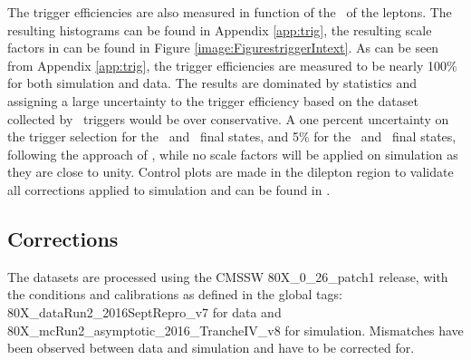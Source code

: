 The trigger efficiencies are also measured in function of the \pt\ of the leptons. The resulting histograms can be found in Appendix \ref{app:trig}, the resulting scale factors in can be found in Figure \ref{image:FigurestriggerIntext}.
%	
As can be seen from Appendix \ref{app:trig}, the trigger efficiencies are measured to be nearly 100\% for both simulation and data. The results are dominated by statistics and assigning a large uncertainty to the trigger efficiency based on the dataset collected by \Etmis\ triggers would be over conservative. A one percent uncertainty on the trigger selection for the \eemu\ and \mumumu\ final states, and 5\% for the \eee\ and \emumu\ final states, following the approach of \cite{Sirunyan:2017kkr}, while no scale factors will be applied on simulation as they are close to unity. Control plots are made in the dilepton region to validate all corrections applied to simulation and can be found in .

\subsection{Corrections}
\label{sec:controldilep}

\label{sec:corrections}
The datasets are processed using the CMSSW 80X\_0\_26\_patch1 release, with the conditions and calibrations as defined in the global tags: 80X\_dataRun2\_2016SeptRepro\_v7 for data and 80X\_mcRun2\_asymptotic\_2016\_TrancheIV\_v8 for simulation. Mismatches have been observed between data and simulation and have to be corrected for. 


